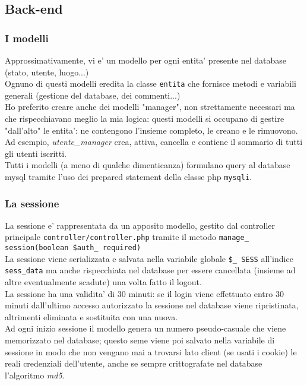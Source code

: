 \documentclass{article}
\begin{document}
\subsection{Back-end}

\subsubsection{I modelli}
Approssimativamente, vi e' un modello per ogni entita' presente nel database (stato, utente, luogo...)\\
Ognuno di questi modelli eredita la classe \texttt{entita} che fornisce metodi e variabili generali (gestione del database, dei commenti...)
\\
Ho preferito creare anche dei modelli "manager", non strettamente necessari ma che rispecchiavano meglio la mia logica: questi modelli si occupano di gestire "dall'alto" le entita': ne contengono l'insieme completo, le creano e le rimuovono. Ad esempio, \emph{utente\_manager} crea, attiva, cancella e contiene il sommario di tutti gli utenti iscritti.
\\
Tutti i modelli (a meno di qualche dimenticanza) formulano query al database mysql tramite l'uso dei prepared statement della classe php \texttt{mysqli}.

\subsubsection{La sessione}
La sessione e' rappresentata da un apposito modello, gestito dal controller principale \texttt{controller/controller.php} tramite il metodo \texttt{manage\_ session(boolean \$auth\_ required)}
\\
La sessione viene serializzata e salvata nella variabile globale \texttt{\$\_ SESS} all'indice \texttt{sess\_data} ma anche rispecchiata nel database per essere cancellata (insieme ad altre eventualmente scadute) una volta fatto il logout.
\\
La sessione ha una validita' di 30 minuti: se il login viene effettuato entro 30 minuti dall'ultimo accesso autorizzato la sessione nel database viene ripristinata, altrimenti eliminata e sostituita con una nuova.
\\
Ad ogni inizio sessione il modello genera un numero pseudo-casuale che viene memorizzato nel database; questo seme viene poi salvato nella variabile di sessione in modo che non vengano mai a trovarsi lato client (se usati i cookie) le reali credenziali dell'utente, anche se sempre crittografate nel database l'algoritmo \emph{md5}.
\\ 
\end{document}
